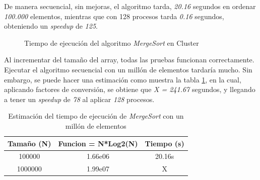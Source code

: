 		De manera secuencial, sin mejoras, el algoritmo tarda, \textit{20.16} segundos en ordenar \textit{100.000} elementos, mientras que con 128 procesos tarda \textit{0.16} segundos, obteniendo un \textit{speedup} de \textit{125}. 
		
		\begin{figure}[!h]
			\centering
			\caption{Tiempo de ejecución del algoritmo \textit{MergeSort} en Cluster}
			\label{fig:mergesort_cluster}
		\end{figure}
		
		Al incrementar del tamaño del array, todas las pruebas funcionan correctamente. Ejecutar el algoritmo secuencial con un millón de elementos tardaría mucho. Sin embargo, se puede hacer una estimación como muestra la tabla \ref{tab:estimacion_mergesort}, en la cual, aplicando factores de conversión, se obtiene que \textit{X = 241.67} segundos, y llegando a tener un \textit{speedup} de \textit{78} al aplicar \textit{128} procesos.
		
		\begin{table}[!h]
			\centering
			\begin{tabular}{|c|c|c|}
				\hline
				\rowcolor{lightgray}
				\textbf{Tamaño (N)} & \textbf{Funcion = N*Log2(N)} & \textbf{Tiempo (s)} \\
				\hline
				100000 & 1.66e06 & 20.16s \\
				\hline
				1000000 & 1.99e07 & X \\
				\hline
				
			\end{tabular}
			\caption{Estimación del tiempo de ejecución de \textit{MergeSort} con un millón de elementos}
			\label{tab:estimacion_mergesort}
		\end{table}
		
